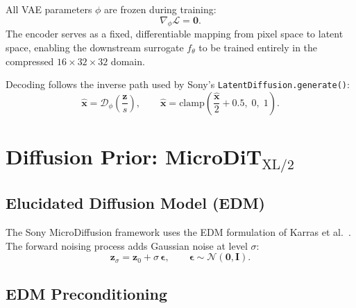 \documentclass[12pt,a4paper]{article}
\newcommand{\N}{\mathcal{N}}
\newcommand{\loss}{\mathcal{L}}
\newcommand{\zvec}{\bm{z}}
\newcommand{\xvec}{\bm{x}}
\theoremstyle{definition}
\begin{document}
All VAE parameters $\phi$ are frozen during training:
\begin{equation}
  \nabla_\phi \loss = \bm{0}.
\end{equation}
The encoder serves as a fixed, differentiable mapping from pixel space to
latent space, enabling the downstream surrogate $f_\theta$ to be trained
entirely in the compressed $16 \times 32 \times 32$ domain.

Decoding follows the inverse path used by Sony's \texttt{LatentDiffusion.generate()}:
\begin{equation}
  \hat{\xvec} = \mathcal{D}_\phi\!\left(\frac{\zvec}{s}\right),
  \qquad \hat{\xvec} = \mathrm{clamp}\!\left(\frac{\hat{\xvec}}{2} + 0.5,\; 0,\; 1\right).
  \label{eq:decode}
\end{equation}

\section{Diffusion Prior: MicroDiT\texorpdfstring{$_{\text{XL/2}}$}{\_XL/2}}
\label{sec:diffusion}

\subsection{Elucidated Diffusion Model (EDM)}

The Sony MicroDiffusion framework \cite{sehwag2024microdit} uses the EDM
formulation of Karras et al.\ \cite{karras2022edm}.  The forward noising
process adds Gaussian noise at level $\sigma$:
\begin{equation}
  \zvec_\sigma = \zvec_0 + \sigma\, \bm{\epsilon},
  \qquad \bm{\epsilon} \sim \N(\bm{0}, \bm{I}).
  \label{eq:forward_noise}
\end{equation}

\subsection{EDM Preconditioning}
\end{document}
